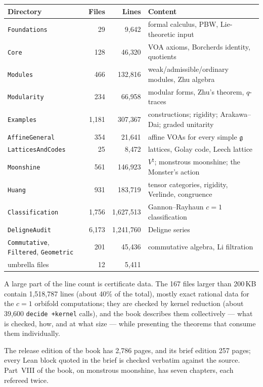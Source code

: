 \documentclass[10pt]{article}
\newcommand{\g}{\mathfrak{g}}
\begin{document}
\begin{center}\small
  \begin{tabular}{lrrl}
    \toprule
    Directory & Files & Lines & Content\\
    \midrule
    \texttt{Foundations} & 29 & 9{,}642 & formal calculus, PBW, Lie-theoretic input\\
    \texttt{Core} & 128 & 46{,}320 & VOA axioms, Borcherds identity, quotients\\
    \texttt{Modules} & 466 & 132{,}816 & weak/admissible/ordinary modules, Zhu algebra\\
    \texttt{Modularity} & 234 & 66{,}958 & modular forms, Zhu's theorem, $q$-traces\\
    \texttt{Examples} & 1{,}181 & 307{,}367 & constructions; rigidity; Arakawa--Dai; graded unitarity\\
    \texttt{AffineGeneral} & 354 & 21{,}641 & affine VOAs for every simple $\g$\\
    \texttt{LatticesAndCodes} & 25 & 8{,}472 & lattices, Golay code, Leech lattice\\
    \texttt{Moonshine} & 561 & 146{,}923 & $V^\natural$; monstrous moonshine; the Monster's action\\
    \texttt{Huang} & 931 & 183{,}719 & tensor categories, rigidity, Verlinde, congruence\\
    \texttt{Classification} & 1{,}756 & 1{,}627{,}513 & Gannon--Rayhaun $c=1$ classification\\
    \texttt{DeligneAudit} & 6{,}173 & 1{,}241{,}760 & Deligne series\\
    \texttt{Commutative}, \texttt{Filtered}, \texttt{Geometric} & 201 & 45{,}436 & commutative algebra, Li filtration\\
    umbrella files & 12 & 5{,}411 & \\
    \bottomrule
  \end{tabular}
\end{center}

A large part of the line count is certificate data. The 167 files larger than 200\,KB contain 1{,}518{,}787 lines
(about 40\% of the total), mostly exact rational data for the $c=1$ orbifold computations; they are checked by kernel
reduction (about 39{,}600 \texttt{decide +kernel} calls), and the book describes them collectively --- what is checked,
how, and at what size --- while presenting the theorems that consume them individually.

The release edition of the book has 2{,}786 pages, and its brief edition 257 pages; every Lean block quoted in
the brief is checked verbatim against the source. Part~VIII of the book, on monstrous moonshine, has seven chapters,
each refereed twice.
\end{document}
